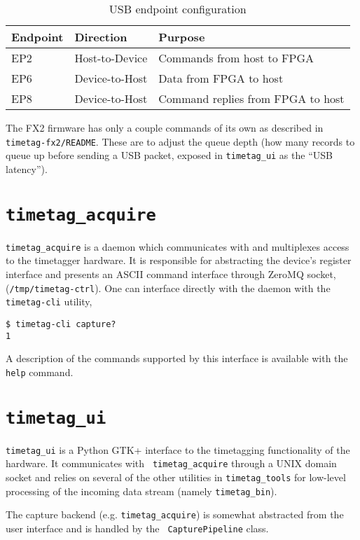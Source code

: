 \begin{table}
  \begin{tabular}{|lll|}
    \hline
    Endpoint & Direction      & Purpose \\
    \hline
    EP2      & Host-to-Device & Commands from host to FPGA \\
    EP6      & Device-to-Host & Data from FPGA to host \\
    EP8      & Device-to-Host & Command replies from FPGA to host \\
    \hline
  \end{tabular}
  \caption{USB endpoint configuration}
  \label{Table:Endpoints}
\end{table}

The FX2 firmware has only a couple commands of its own as described in
{\tt timetag-fx2/README}. These are to adjust the queue depth (how
many records to queue up before sending a USB packet, exposed in
{\tt timetag\_ui} as the ``USB latency'').

\section{\tt timetag\_acquire}
{\tt timetag\_acquire} is a daemon which communicates with and
multiplexes access to the timetagger hardware. It is responsible for
abstracting the device's register interface and presents an ASCII
command interface through ZeroMQ socket,
({\tt /tmp/timetag-ctrl}). One can interface directly with the daemon
with the {\tt timetag-cli} utility,

\begin{verbatim}
$ timetag-cli capture?
1
\end{verbatim}

A description of the commands supported by this interface is available
with the {\tt help} command.

\section{\tt timetag\_ui}

{\tt timetag\_ui} is a Python GTK+ interface to the timetagging
functionality of the hardware. It communicates with {\tt
timetag\_acquire} through a UNIX domain socket and relies on several
of the other utilities in {\tt timetag\_tools} for low-level
processing of the incoming data stream (namely {\tt timetag\_bin}).

The capture backend (e.g. {\tt timetag\_acquire}) is somewhat
abstracted from the user interface and is handled by the {\tt
CapturePipeline} class.

